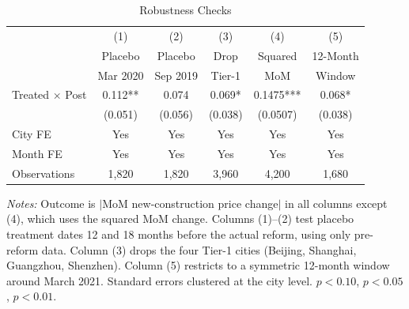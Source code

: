 \begin{table}[H]
\centering
\caption{Robustness Checks}
\label{tab:robustness}
\begin{threeparttable}
\begin{tabular}{lccccc}
\toprule
 & (1) & (2) & (3) & (4) & (5) \\
 & Placebo & Placebo & Drop & Squared & 12-Month \\
 & Mar 2020 & Sep 2019 & Tier-1 & MoM & Window \\
\midrule
Treated $\times$ Post & 0.112** & 0.074 & 0.069* & 0.1475*** & 0.068* \\
 & (0.051) & (0.056) & (0.038) & (0.0507) & (0.038) \\
\midrule
City FE & Yes & Yes & Yes & Yes & Yes \\
Month FE & Yes & Yes & Yes & Yes & Yes \\
Observations & 1,820 & 1,820 & 3,960 & 4,200 & 1,680 \\
\bottomrule
\end{tabular}
\begin{tablenotes}[flushleft]
\small
\item \textit{Notes:} Outcome is $|$MoM new-construction price change$|$ in all columns except (4), which uses the squared MoM change. Columns (1)--(2) test placebo treatment dates 12 and 18 months before the actual reform, using only pre-reform data. Column (3) drops the four Tier-1 cities (Beijing, Shanghai, Guangzhou, Shenzhen). Column (5) restricts to a symmetric 12-month window around March 2021. Standard errors clustered at the city level. \sym{*} $p<0.10$, \sym{**} $p<0.05$, \sym{***} $p<0.01$.
\end{tablenotes}
\end{threeparttable}
\end{table}

